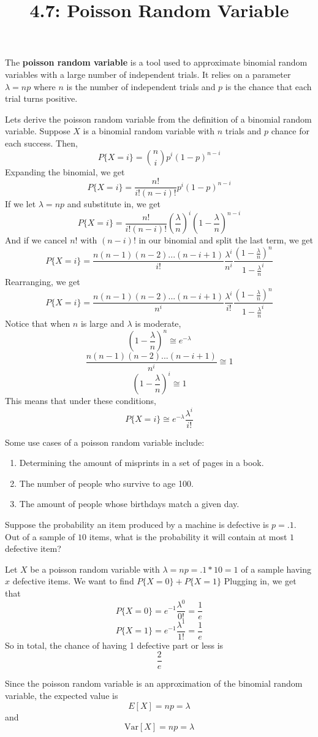 \documentclass{article}
\title{4.7: Poisson Random Variable}
\begin{document}
\maketitle

\begin{definition}
The \textbf{poisson random variable} is a tool used to approximate binomial random variables with a large number of independent trials. It relies on a parameter $\lambda = np$ where $n$ is the number of independent trials and $p$ is the chance that each trial turns positive.  
\end{definition}

Lets derive the poisson random variable from the definition of a binomial random variable. Suppose $X$ is a binomial random variable with $n$ trials and $p$ chance for each success. Then, $$P\{X = i\} = \binom{n}{i}p^i(1-p)^{n-i}$$Expanding the binomial, we get $$P\{X = i\} = \frac{n!}{i!(n-i)!}p^i (1-p)^{n-i}$$If we let $\lambda = np$ and substitute in, we get $$P\{X = i\} = \frac{n!}{i!(n-i)!}(\frac{\lambda}{n})^i (1-\frac{\lambda}{n})^{n-i}$$And if we cancel $n!$ with $(n-i)!$ in our binomial and split the last term, we get $$P\{X = i\} = \frac{n(n-1)(n-2)...(n-i+1)}{i!}\frac{\lambda^i}{n^i}\frac{(1-\frac{\lambda}{n})^n}{1-\frac{\lambda}{n}^i}$$Rearranging, we get $$P\{X = i\} =\frac{n(n-1)(n-2)...(n-i+1)}{n^i}\frac{\lambda^i}{i!}\frac{(1-\frac{\lambda}{n})^n}{1-\frac{\lambda}{n}^i}$$Notice that when $n$ is large and $\lambda$ is moderate, $$(1-\frac{\lambda}{n})^n \cong e^{-\lambda}$$ $$\frac{n(n-1)(n-2)...(n-i+1)}{n^i} \cong 1$$ $$(1-\frac{\lambda}{n})^i \cong 1$$This means that under these conditions, $$P\{X = i\} \cong e^{-\lambda}\frac{\lambda^i}{i!}$$

Some use cases of a poisson random variable include:

\begin{enumerate}
    \item Determining the amount of misprints in a set of pages in a book.
    \item The number of people who survive to age 100.
    \item The amount of people whose birthdays match a given day.
\end{enumerate}


\begin{example}
Suppose the probability an item produced by a machine is defective is $p = .1$. Out of a sample of $10$ items, what is the probability it will contain at most $1$ defective item?
\end{example}

\begin{solution}
Let $X$ be a poisson random variable with $\lambda = np = .1 * 10 = 1$ of a sample having $x$ defective items. We want to find $P\{X = 0\} + P\{X = 1\}$ Plugging in, we get that $$P\{X = 0\} = e^{-1}\frac{\lambda^0}{0!} = \frac{1}{e}$$$$P\{X = 1\} = e^{-1}\frac{\lambda^1}{1!} = \frac{1}{e}$$ So in total, the chance of having 1 defective part or less is $$\frac{2}{e}$$
\end{solution}

Since the poisson random variable is an approximation of the binomial random variable, the expected value is $$E[X] = np = \lambda$$ and $$\text{Var}[X] = np = \lambda$$
\end{document}

